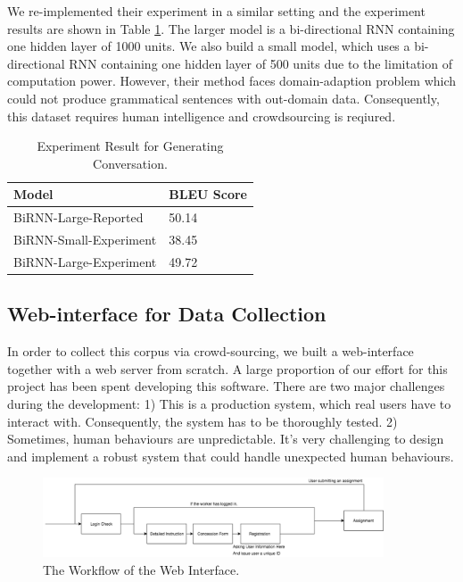 \documentclass[bsc,frontabs,twoside,singlespacing,parskip,deptreport]{infthesis}     %
\begin{document}
We re-implemented their experiment in a similar setting and the experiment results are shown in Table \ref{tab:genresult}. The larger model is a bi-directional RNN containing one hidden layer of 1000 units. We also build a small model, which uses a bi-directional RNN containing one hidden layer of 500 units due to the limitation of computation power. However, their method faces domain-adaption problem which could not produce grammatical sentences with out-domain data. Consequently, this dataset requires human intelligence and crowdsourcing is reqiured. 

\begin{table}[]
\centering
\begin{tabular}{|l|l|}
\hline
Model                  & BLEU Score \\ \hline
BiRNN-Large-Reported   & 50.14      \\ \hline
BiRNN-Small-Experiment & 38.45      \\ \hline
BiRNN-Large-Experiment & 49.72      \\ \hline
\end{tabular}
\caption{Experiment Result for Generating Conversation\cite{indurthi2017generating}.}
\label{tab:genresult}
\end{table}

\newpage
\subsection{Web-interface for Data Collection}

In order to collect this corpus via crowd-sourcing, we built a web-interface together with a web server from scratch. A large proportion of our effort for this project has been spent developing this software. There are two major challenges during the development: 1) This is a production system, which real users have to interact with. Consequently, the system has to be thoroughly tested. 2) Sometimes, human behaviours are unpredictable. It's very challenging to design and implement a robust system that could handle unexpected human behaviours.


\begin{figure}[h]
    \centering
    \includegraphics[width=0.9\textwidth]{process.png}
    \caption{The Workflow of the Web Interface.}
    \label{fig:web}
\end{figure}
\end{document}

